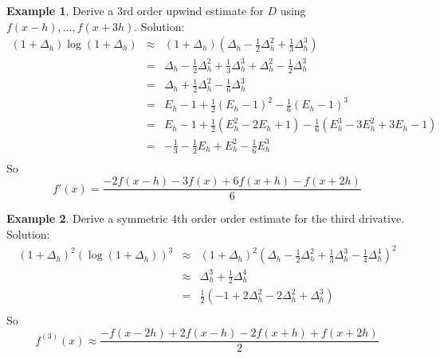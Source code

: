 \documentclass[a4paper]{article}
\theoremstyle{definition}
\newtheorem{example}{Example}[section]
\begin{document}
\begin{example}
Derive a 3rd order upwind estimate for $D$ using $f(x-h),\ldots,f(x+3h)$.
Solution:
\begin{eqnarray*}
(1+\Delta_h)\log(1+\Delta_h) & \approx & (1+\Delta_h)(\Delta_h-\frac{1}{2}\Delta_h^2+\frac{1}{3}\Delta_h^3) \\
& = & \Delta_h-\frac{1}{2}\Delta_h^2+\frac{1}{3}\Delta_h^3+\Delta_h^2-\frac{1}{2}\Delta_h^3 \\
& = & \Delta_h+\frac{1}{2}\Delta_h^2-\frac{1}{6}\Delta_h^3 \\
& = & E_h-1+\frac{1}{2}(E_h-1)^2-\frac{1}{6}(E_h-1)^3 \\
& = & E_h-1+\frac{1}{2}(E_h^2-2E_h+1)-\frac{1}{6}(E_h^3-3E_h^2+3E_h-1) \\
& = & -\frac{1}{3}-\frac{1}{2}E_h+E_h^2-\frac{1}{6}E_h^3 \\
\end{eqnarray*}
So 
\[
f'(x) = \frac{-2f(x-h)-3f(x)+6f(x+h)-f(x+2h)}{6}
\]
\end{example}

\begin{example}
Derive a symmetric 4th order order estimate for the third drivative.
Solution:
\begin{eqnarray*}
(1+\Delta_h)^2(\log(1+\Delta_h))^3 & \approx &
(1+\Delta_h)^2(\Delta_h-\frac{1}{2}\Delta_h^2+\frac{1}{3}\Delta_h^3-\frac{1}{4}\Delta_h^4)^2 \\
& \approx & \Delta_h^3+\frac{1}{2}\Delta_h^4 \\
& = & \frac{1}{2}(-1+2\Delta_h^2-2\Delta_h^2+\Delta_h^3) \\
\end{eqnarray*}
So
\[
f^{(3)}(x) \approx \frac{-f(x-2h)+2f(x-h)-2f(x+h)+f(x+2h)}{2}
\]
\end{example}
\end{document}
